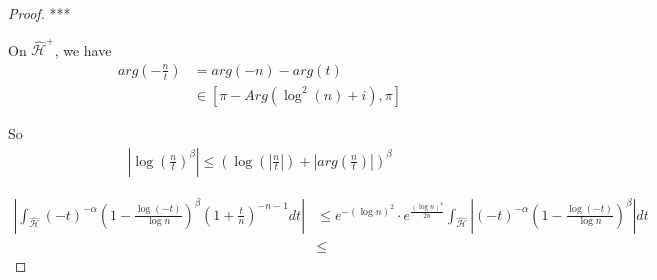 \documentclass[../main.tex]{subfiles}
\begin{document}
\begin{proof}
	***
	
	
%	

	On $\hat{\mathcal{H}}^+$, we have
	\begin{align*}
		arg\left(-\frac{n}{t}\right) &= arg(-n) - arg(t)\\
									&\in [\pi - Arg(\log^2 (n) + i), \pi]
	\end{align*}
	
	So
	\begin{align*}
		\left| {\log\left(\frac{n}{t}\right)}^\beta \right| \leq
		{\left(\log\left(\left|\frac{n}{t}\right|\right) + \left|arg\left(\frac{n}{t}\right)\right|\right)}^\beta
	\end{align*}
	
	\begin{align*}
	\left| \int_{\hat{\mathcal{H}}} {(-t)}^{-\alpha} {\left( 1 - \frac{\log (-t)}{\log n} \right)}^\beta  {\left( 1 + \frac{t}{n} \right)}^{-n-1} dt \right|
	&\leq e^{-{(\log n)}^2} \cdot e^{\frac{{(\log n)}^4}{2n}} \int_{\hat{\mathcal{H}}} \left| {(-t)}^{-\alpha} {\left( 1 - \frac{\log (-t)}{\log n} \right)}^\beta \right| dt\\
	&\leq
	\end{align*}
	
%		
%		
\end{proof}
\end{document}
